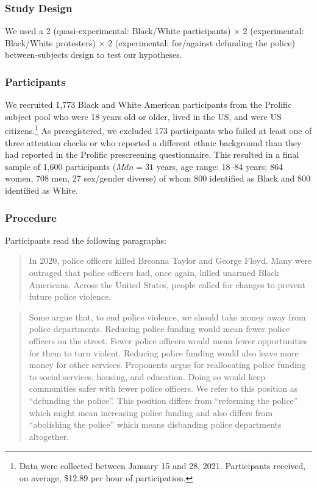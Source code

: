 \documentclass[12pt, letterpaper]{article}
\begin{document}
\hypertarget{study-design-1}{%
\subsubsection{Study Design}\label{study-design-1}}

We used a 2 (quasi-experimental: Black/White participants) \(\times\) 2
(experimental: Black/White protesters) \(\times\) 2 (experimental:
for/against defunding the police) between-subjects design to test our
hypotheses.

\hypertarget{participants-1}{%
\subsubsection{Participants}\label{participants-1}}

We recruited 1,773 Black and White American participants from the
Prolific subject pool who were 18 years old or older, lived in the US,
and were US citizens.\footnote{Data were collected between January 15
  and 28, 2021. Participants received, on average, \$12.89 per hour of
  participation.} As preregistered, we excluded 173 participants who
failed at least one of three attention checks or who reported a
different ethnic background than they had reported in the Prolific
prescreening questionnaire. This resulted in a final sample of 1,600
participants (\(\textit{Mdn} = 31\) years, age range: 18--84 years; 864
women, 708 men, 27 sex/gender diverse) of whom 800 identified as Black
and 800 identified as White.

\hypertarget{procedure-1}{%
\subsubsection{Procedure}\label{procedure-1}}

Participants read the following paragraphs:

\begin{quote}
In 2020, police officers killed Breonna Taylor and George Floyd. Many
were outraged that police officers had, once again, killed unarmed Black
Americans. Across the United States, people called for changes to
prevent future police violence.
\end{quote}

\begin{quote}
Some argue that, to end police violence, we should take money away from
police departments. Reducing police funding would mean fewer police
officers on the street. Fewer police officers would mean fewer
opportunities for them to turn violent. Reducing police funding would
also leave more money for other services. Proponents argue for
reallocating police funding to social services, housing, and education.
Doing so would keep communities safer with fewer police officers. We
refer to this position as ``defunding the police''. This position
differs from ``reforming the police'' which might mean increasing police
funding and also differs from ``abolishing the police'' which means
disbanding police departments altogether.
\end{quote}
\end{document}
